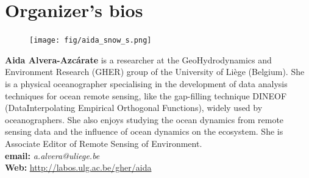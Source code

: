 \section{Organizer's bios}
\label{sec:bios}


\parbox{6.5in}{
\begin{figure} %
    \vspace{-\intextsep}
    \hspace*{-.35\columnsep}\texttt{[image: fig/aida\_snow\_s.png]}
\end{figure}
\textbf{Aida Alvera-Azcárate} is a researcher at the GeoHydrodynamics
and Environment Research (GHER) group of the University of Li\`{e}ge
(Belgium). She is a physical oceanographer specialising in the
development of data analysis techniques for ocean remote sensing, like
the gap-filling technique DINEOF (DataInterpolating Empirical Orthogonal
Functions), widely used by oceanographers. She also enjoys studying the
ocean dynamics from remote sensing data and the influence of ocean
dynamics on the ecosystem. She is Associate Editor of Remote Sensing of
Environment.\\

\textbf{email: }\emph{a.alvera@uliege.be}\\
\textbf{Web: }\url{http://labos.ulg.ac.be/gher/aida}
}

\vspace{20mm}

